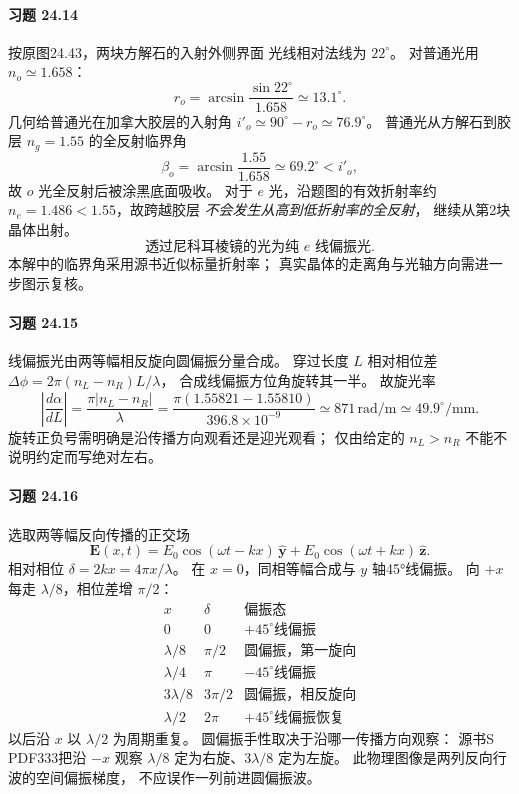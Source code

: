 \paragraph{习题 24.14}
按原图24.43，两块方解石的入射外侧界面
光线相对法线为 \(22^\circ\)。
对普通光用 \(n_o\simeq1.658\)：
\[
r_o=\arcsin\frac{\sin22^\circ}{1.658}
\simeq13.1^\circ.
\]
几何给普通光在加拿大胶层的入射角
\(i'_o\simeq90^\circ-r_o\simeq76.9^\circ\)。
普通光从方解石到胶层 \(n_g=1.55\)
的全反射临界角
\[
\boxed{\beta_o=\arcsin\frac{1.55}{1.658}
\simeq69.2^\circ<i'_o},
\]
故 \(o\) 光全反射后被涂黑底面吸收。
对于 \(e\) 光，沿题图的有效折射率约
\(n_e=1.486<1.55\)，故跨越胶层
\emph{不会发生从高到低折射率的全反射}，
继续从第2块晶体出射。
\[
\boxed{\text{透过尼科耳棱镜的光为纯 }e
\text{ 线偏振光}}.
\]
本解中的临界角采用源书近似标量折射率；
真实晶体的走离角与光轴方向需进一步图示复核。

\paragraph{习题 24.15}
线偏振光由两等幅相反旋向圆偏振分量合成。
穿过长度 \(L\) 相对相位差
\(\Delta\phi=2\pi(n_L-n_R)L/\lambda\)，
合成线偏振方位角旋转其一半。
故旋光率
\[
\boxed{\left|\frac{d\alpha}{dL}\right|
=\frac{\pi|n_L-n_R|}{\lambda}
=\frac{\pi(1.55821-1.55810)}{396.8\times10^{-9}}
\simeq871\,\mathrm{rad/m}
\simeq49.9^\circ/\mathrm{mm}}.
\]
旋转正负号需明确是沿传播方向观看还是迎光观看；
仅由给定的 \(n_L>n_R\) 不能不说明约定而写绝对左右。

\paragraph{习题 24.16}
选取两等幅反向传播的正交场
\[
\boldsymbol E(x,t)=E_0\cos(\omega t-kx)\,\hat{\boldsymbol y}
+E_0\cos(\omega t+kx)\,\hat{\boldsymbol z}.
\]
相对相位 \(\delta=2kx=4\pi x/\lambda\)。
在 \(x=0\)，同相等幅合成与 \(y\) 轴45°线偏振。
向 \(+x\) 每走 \(\lambda/8\)，相位差增 \(\pi/2\)：
\[
\begin{array}{c|c|l}
x&\delta&\text{偏振态}\\\hline
0&0&+45^\circ\text{线偏振}\\
\lambda/8&\pi/2&\text{圆偏振，第一旋向}\\
\lambda/4&\pi&-45^\circ\text{线偏振}\\
3\lambda/8&3\pi/2&\text{圆偏振，相反旋向}\\
\lambda/2&2\pi&+45^\circ\text{线偏振恢复}
\end{array}
\]
以后沿 \(x\) 以 \(\lambda/2\) 为周期重复。
圆偏振手性取决于沿哪一传播方向观察：
源书S PDF333把沿 \(-x\) 观察
\(\lambda/8\) 定为右旋、\(3\lambda/8\) 定为左旋。
此物理图像是两列反向行波的空间偏振梯度，
不应误作一列前进圆偏振波。
